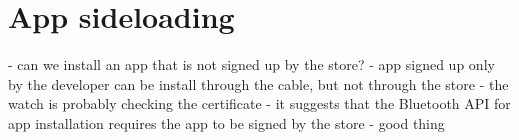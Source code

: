 \section{App sideloading}
- can we install an app that is not signed up by the store?
- app signed up only by the developer can be install through the cable, but not through the store
- the watch is probably checking the certificate
- it suggests that the Bluetooth API for app installation requires the app to be signed by the store - good thing
